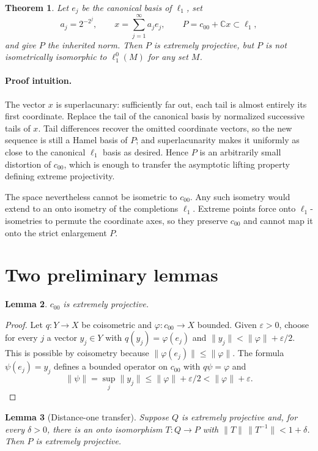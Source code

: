 \documentclass[11pt]{article}
\newtheorem{theorem}{Theorem}
\newtheorem{lemma}[theorem]{Lemma}
\newcommand{\C}{\mathbb C}
\begin{document}
\begin{theorem}\label{thm:main}
Let $e_j$ be the canonical basis of $\ell_1$, set
\[
 a_j=2^{-2^j},\qquad x=\sum_{j=1}^\infty a_j e_j,
 \qquad P=c_{00}+\C x\subset\ell_1,
\]
and give $P$ the inherited norm.  Then $P$ is extremely projective, but $P$ is
not isometrically isomorphic to $\ell_1^0(M)$ for any set $M$.
\end{theorem}

\paragraph{Proof intuition.}
The vector $x$ is superlacunary: sufficiently far out, each tail is almost
entirely its first coordinate.  Replace the tail of the canonical basis by
normalized successive tails of $x$.  Tail differences recover the omitted
coordinate vectors, so the new sequence is still a Hamel basis of $P$; and
superlacunarity makes it uniformly as close to the canonical $\ell_1$ basis
as desired.  Hence $P$ is an arbitrarily small distortion of $c_{00}$, which
is enough to transfer the asymptotic lifting property defining extreme
projectivity.

The space nevertheless cannot be isometric to $c_{00}$.  Any such isometry
would extend to an onto isometry of the completions $\ell_1$.  Extreme points
force onto $\ell_1$-isometries to permute the coordinate axes, so they preserve
$c_{00}$ and cannot map it onto the strict enlargement $P$.

\section{Two preliminary lemmas}

\begin{lemma}\label{lem:c00}
$c_{00}$ is extremely projective.
\end{lemma}

\begin{proof}
Let $q:Y\to X$ be coisometric and $\varphi:c_{00}\to X$ bounded.  Given
$\varepsilon>0$, choose for every $j$ a vector $y_j\in Y$ with
$q(y_j)=\varphi(e_j)$ and
$\|y_j\|<\|\varphi\|+\varepsilon/2$.  This is possible by
coisometry because $\|\varphi(e_j)\|\le\|\varphi\|$.  The formula
$\psi(e_j)=y_j$ defines a bounded operator on $c_{00}$ with
$q\psi=\varphi$ and
\[
 \|\psi\|=\sup_j\|y_j\|\le\|\varphi\|+\varepsilon/2
 <\|\varphi\|+\varepsilon.
\]
\end{proof}

\begin{lemma}[Distance-one transfer]\label{lem:transfer}
Suppose $Q$ is extremely projective and, for every $\delta>0$, there is an
onto isomorphism $T:Q\to P$ with
$\|T\|\,\|T^{-1}\|<1+\delta$.  Then $P$ is extremely projective.
\end{lemma}
\end{document}
